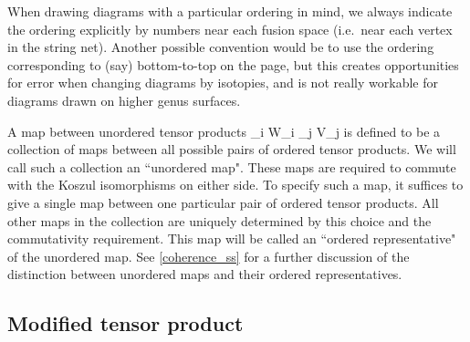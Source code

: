 When drawing diagrams with a particular ordering in mind, we always indicate the ordering explicitly by numbers near each fusion space (i.e.\ near
each vertex in the string net).
Another possible convention would be to use the ordering corresponding to (say) bottom-to-top on the page,
but this creates opportunities for error when changing diagrams by isotopies,
and is not really workable for diagrams drawn on higher genus surfaces.

A map between unordered tensor products
\be
	\bigotimes_i W_i \; \to \; \bigotimes_j V_j
\ee
is defined to be a collection of maps between
all possible pairs of ordered tensor products.
We will call such a collection an ``unordered map".
These maps are required to commute with the Koszul isomorphisms on either side.
To specify such a map, it suffices to give a single map between one particular pair of ordered tensor products.
All other maps in the collection are uniquely determined by this choice and the commutativity requirement.
This map will be called an ``ordered representative" of the unordered map.
See \ref{coherence_ss} for a further discussion of the distinction between unordered maps and
their ordered representatives.





\subsection{Modified tensor product} \label{modified_tensor_product}

